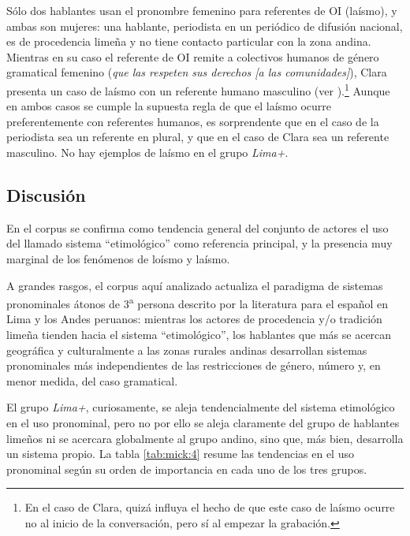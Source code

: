 \documentclass[output=paper]{../langscibook}
\begin{document}
Sólo dos hablantes usan el pronombre femenino para referentes de OI (laísmo), y ambas son mujeres: una hablante, periodista en un periódico de difusión nacional, es de procedencia limeña y no tiene contacto particular con la zona andina. Mientras en su caso el referente de OI remite a colectivos humanos de género gramatical femenino (\textit{que las respeten sus derechos [a las comunidades]}), Clara presenta un caso de laísmo con un referente humano masculino (ver ).\footnote{En el caso de Clara, quizá influya el hecho de que este caso de laísmo ocurre no al inicio de la conversación, pero sí al empezar la grabación.} Aunque en ambos casos se cumple la supuesta regla de que el laísmo ocurre preferentemente con referentes humanos, es sorprendente que en el caso de la periodista sea un referente en plural, y que en el caso de Clara sea un referente masculino. No hay ejemplos de laísmo en el grupo \textit{Lima+}.

\subsection{Discusión}\label{sec:mick:5.6}

En el corpus se confirma como tendencia general del conjunto de actores el uso del llamado sistema “etimológico” como referencia principal, y la presencia muy marginal de los fenómenos de loísmo y laísmo. 

A grandes rasgos, el corpus aquí analizado actualiza el paradigma de sistemas pronominales átonos de 3\textsuperscript{a} persona descrito por la literatura para el español en Lima y los Andes peruanos: mientras los actores de procedencia y/o tradición limeña tienden hacia el sistema “etimológico”, los hablantes que más se acercan geográfica y culturalmente a las zonas rurales andinas desarrollan sistemas pronominales más independientes de las restricciones de género, número y, en menor medida, del caso gramatical.

El grupo \textit{Lima+}, curiosamente, se aleja tendencialmente del sistema etimológico en el uso pronominal, pero no por ello se aleja claramente del grupo de hablantes limeños ni se acercara globalmente al grupo andino, sino que, más bien, desarrolla un sistema propio. La tabla \ref{tab:mick:4} resume las tendencias en el uso pronominal según su orden de importancia en cada uno de los tres grupos.
\end{document}
